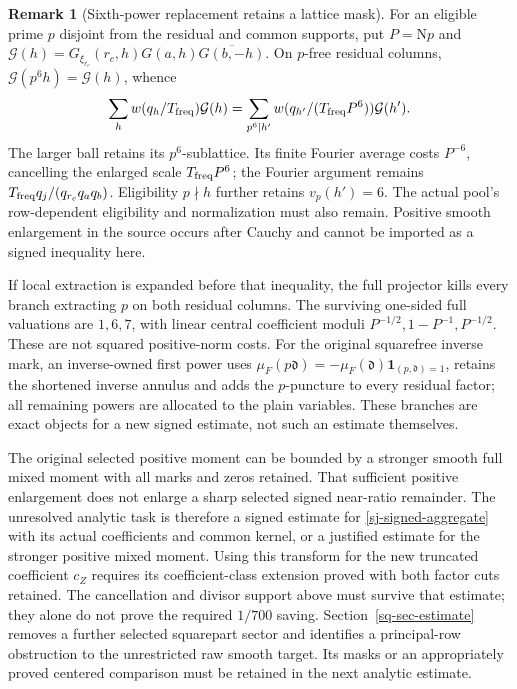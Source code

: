 \documentclass[11pt]{article}
\theoremstyle{definition}
\newtheorem{remark}[theorem]{Remark}
\newcommand{\N}{\mathrm N}
\newcommand{\Id}{\mathbf 1}
\begin{document}
\begin{remark}[Sixth-power replacement retains a lattice mask]
\label{sj-sixth-power-remark}
For an eligible prime $p$ disjoint from the residual and common supports,
put $P=\N p$ and
$\mathcal G(h)=G_{\xi_{r_c}}(r_c,h)G(a,h)\overline{G(b,-h)}$.
On $p$-free residual columns, $\mathcal G(p^6h)=\mathcal G(h)$, whence
\[
 \sum_h w(q_h/T_{\rm freq})\mathcal G(h)
 =\sum_{p^6\mid h'}w(q_{h'}/(T_{\rm freq}P^6))\mathcal G(h').
\]
The larger ball retains its $p^6$-sublattice.  Its finite Fourier average
costs $P^{-6}$, cancelling the enlarged scale $T_{\rm freq}P^6$; the Fourier argument
remains $T_{\rm freq}q_j/(q_{r_c}q_aq_b)$.  Eligibility $p\nmid h$ further retains
$v_p(h')=6$.  The actual pool's row-dependent eligibility and normalization
must also remain.  Positive smooth enlargement in the source occurs after
Cauchy and cannot be imported as a signed inequality here.

If local extraction is expanded before that inequality, the full projector
kills every branch extracting $p$ on both residual columns.  The surviving
one-sided full valuations are $1,6,7$, with linear central coefficient
moduli $P^{-1/2},1-P^{-1},P^{-1/2}$.  These are not squared positive-norm
costs.  For the original squarefree inverse mark, an inverse-owned first power uses
$\mu_F(p\mathfrak d)=-\mu_F(\mathfrak d)\Id_{(p,\mathfrak d)=1}$, retains the shortened inverse
annulus and adds the $p$-puncture to every residual factor; all remaining
powers are allocated to the plain variables.  These branches are exact
objects for a new signed estimate, not such an estimate themselves.
\end{remark}

The original selected positive moment can be bounded by a stronger smooth
full mixed moment with all marks and zeros retained.  That sufficient
positive enlargement does not enlarge a sharp selected signed near-ratio
remainder.  The unresolved analytic task is therefore a signed estimate
for \eqref{sj-signed-aggregate} with its actual coefficients and common
kernel, or a justified estimate for the stronger positive mixed moment.
Using this transform for the new truncated coefficient $c_Z$ requires its coefficient-class extension proved with both factor cuts retained. The cancellation and divisor support above must survive that estimate;
they alone do not prove the required $1/700$ saving. Section~\ref{sq-sec-estimate}
removes a further selected squarepart sector and identifies a principal-row
obstruction to the unrestricted raw smooth target. Its masks or an appropriately
proved centered comparison must be retained in the next analytic estimate.
\end{document}

